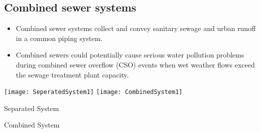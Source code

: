 \subsection{Combined sewer systems}
\begin{itemize}
\item Combined sewer systems collect and convey sanitary sewage and urban runoff in a common piping system.
\item Combined sewers could potentially cause serious water pollution problems during combined sewer overflow (CSO) events when wet weather flows exceed the sewage treatment plant capacity.
	\end{itemize}
\begin{center}
\texttt{[image: SeperatedSystem1]} \hspace{1 cm} \texttt{[image: CombinedSystem1]}
\end{center}
			\hspace{2.6cm} Separated System \hspace{3.2cm} \parbox{\textwidth}{Combined System}\\

